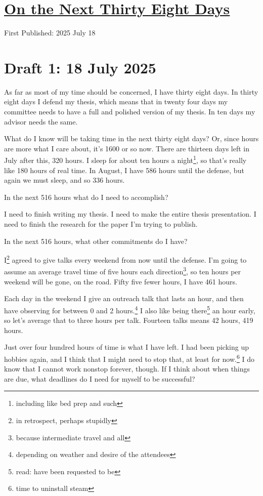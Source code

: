 \documentclass[12pt]{article}
\renewcommand{\,}{\textsuperscript{,}}
\begin{document}
  
\doublespacing  
\section{\href{thirty-eight-days.html}{On the Next Thirty Eight Days}}  
First Published: 2025 July 18

\section{Draft 1: 18 July 2025}

As far as most of my time should be concerned, I have thirty eight days.  
In thirty eight days I defend my thesis, which means that in twenty four days my committee needs to have a full and polished version of my thesis.  
In ten days my advisor needs the same.

What do I know will be taking time in the next thirty eight days?  
Or, since hours are more what I care about, it's 1600 or so now.  
There are thirteen days left in July after this, 320 hours.  
I sleep for about ten hours a night\footnote{including like bed prep and such}, so that's really like 180 hours of real time.  
In August, I have 586 hours until the defense, but again we must sleep, and so 336 hours.

In the next 516 hours what do I need to accomplish?

I need to finish writing my thesis.  
I need to make the entire thesis presentation.  
I need to finish the research for the paper I'm trying to publish.

In the next 516 hours, what other commitments do I have?

I\footnote{in retrospect, perhaps stupidly} agreed to give talks every weekend from now until the defense.  
I'm going to assume an average travel time of five hours each direction\footnote{because intermediate travel and all}, so ten hours per weekend will be gone, on the road.  
Fifty five fewer hours, I have 461 hours.

Each day in the weekend I give an outreach talk that lasts an hour, and then have observing for between 0 and 2 hours.\footnote{depending on weather and desire of the attendees}  
I also like being there\footnote{read: have been requested to be} an hour early, so let's average that to three hours per talk.  
Fourteen talks means 42 hours, 419 hours.

Just over four hundred hours of time is what I have left.  
I had been picking up hobbies again, and I think that I might need to stop that, at least for now.\footnote{time to uninstall steam}  
I do know that I cannot work nonstop forever, though.  
If I think about when things are due, what deadlines do I need for myself to be successful?
\end{document}
